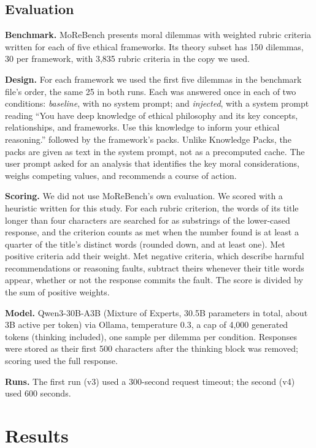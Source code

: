 \documentclass[11pt,a4paper]{article}
\begin{document}
\subsection{Evaluation}

\textbf{Benchmark.} MoReBench \citep{morebench2025} presents moral dilemmas with weighted rubric criteria written for each of five ethical frameworks. Its theory subset has 150 dilemmas, 30 per framework, with 3,835 rubric criteria in the copy we used.

\textbf{Design.} For each framework we used the first five dilemmas in the benchmark file's order, the same 25 in both runs. Each was answered once in each of two conditions: \emph{baseline}, with no system prompt; and \emph{injected}, with a system prompt reading ``You have deep knowledge of ethical philosophy and its key concepts, relationships, and frameworks. Use this knowledge to inform your ethical reasoning.'' followed by the framework's packs. Unlike Knowledge Packs, the packs are given as text in the system prompt, not as a precomputed cache. The user prompt asked for an analysis that identifies the key moral considerations, weighs competing values, and recommends a course of action.

\textbf{Scoring.} We did not use MoReBench's own evaluation. We scored with a heuristic written for this study. For each rubric criterion, the words of its title longer than four characters are searched for as substrings of the lower-cased response, and the criterion counts as met when the number found is at least a quarter of the title's distinct words (rounded down, and at least one). Met positive criteria add their weight. Met negative criteria, which describe harmful recommendations or reasoning faults, subtract theirs whenever their title words appear, whether or not the response commits the fault. The score is divided by the sum of positive weights.

\textbf{Model.} Qwen3-30B-A3B (Mixture of Experts, 30.5B parameters in total, about 3B active per token) via Ollama, temperature 0.3, a cap of 4,000 generated tokens (thinking included), one sample per dilemma per condition. Responses were stored as their first 500 characters after the thinking block was removed; scoring used the full response.

\textbf{Runs.} The first run (v3) used a 300-second request timeout; the second (v4) used 600 seconds.

\section{Results}
\end{document}
